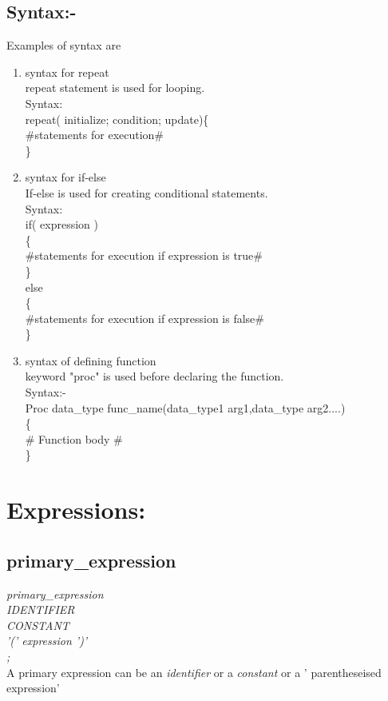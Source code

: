 \documentclass[11pt]{article}
\begin{document}
\subsection{Syntax:-}
Examples of syntax are
\begin{enumerate}
\item syntax for repeat	\\
repeat statement is used for looping.\\
	Syntax:\\
 repeat( initialize; condition; update)\{ \\
\hspace*{1cm}   \#statements for execution\#\\
 \}\\
\item syntax for if-else\\
If-else is used for creating conditional statements.\\
Syntax:\\
if( expression ) \\
\{ \\
\hspace*{1cm}    \#statements for execution if expression is true\# \\
\} \\
else \\
\{ \\
\hspace*{1cm}    \#statements for execution if expression is false\# \\
\} \\

\item syntax of defining function\\
keyword "proc" is used before declaring the function.\\
Syntax:-\\
Proc data\_type func\_name(data\_type1 arg1,data\_type arg2....)\\
\{\\
\hspace*{1cm} \# Function body \#\\
\}\\
\end{enumerate}

\section{Expressions:}

\subsection{primary\_expression}
{\itshape
primary\_expression\\
\hspace*{1cm} IDENTIFIER\\
\hspace*{1cm}   CONSTANT\\
\hspace*{1cm}   '(' expression ')'\\
\hspace*{1cm};\\
}
A primary expression can be an \textit{identifier} or a \textit{constant} or a ' parentheseised expression'
\end{document}
